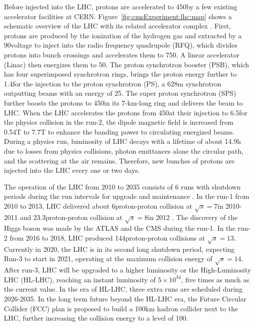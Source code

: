 Before injected into the LHC, protons are accelerated to 450\GeV by a few existing accelerator facilities at CERN. Figure~\ref{fig:cmsExperiment:lhc:map} shows a schematic overview of the LHC with its related accelerator complex  \cite{exhep:lhcInject:Benedikt:2004wm}. First, protons are produced by the ionization of the hydrogen gas and extracted by a 90\keV voltage to inject into the radio frequency quadrupole (RFQ), which divides protons into bunch crossings and accelerates them to 750\keV. A linear accelerator (Linac) then energizes them to 50\MeV. The proton synchrotron booster (PSB), which has four superimposed synchrotron rings, brings the proton energy further to 1.4\GeV for the injection to the proton synchrotron (PS), a 628m synchrotron outputting beams with an energy of 25\GeV. The super proton synchrotron (SPS) further boosts the protons to 450\GeV in its 7-km-long ring and delivers the beam to LHC. When the LHC accelerates the protons from 450\GeV at their injection to 6.5\TeV for the physics collision in the run-2, the dipole magnetic field is increased from 0.54T to 7.7T to enhance the banding power to circulating energized beams. During a physics run, luminosity of LHC decays with a lifetime of about 14.9h \cite{exhep:lhc:Evans:2008zzb} due to losses from physics collisions, photon emittances alone the circular path, and the scattering at the air remains. Therefore, new bunches of protons are injected into the LHC every one or two days.



The operation of the LHC from 2010 to 2035 consists of 6 runs with shutdown periods during the run intervals for upgrade and maintenance . In the run-1 from 2010 to 2013, LHC delivered about 6\fbinv proton-proton collision at $\sqrt{s}=7$\TeV in 2010-2011 and 23.3\fbinv proton-proton collision at $\sqrt{s}=8$\TeV in 2012 \cite{cms:publicLumiInfo}. The discovery of the Higgs boson was made by the ATLAS \cite{exhep:atlasHiggsDisc:Aad:2012tfa} and the CMS \cite{exhep:cmsHiggsDisc:Chatrchyan:2012ufa} during the run-1. In the run-2 from 2016 to 2018, LHC produced 144\fbinv proton-proton collisions at $\sqrt{s}=13$\TeV \cite{cms:publicLumiInfo}. Currently in 2020, the LHC is in its second long shutdown period, expecting Run-3 to start in 2021, operating at the maximum collision energy of $\sqrt{s}=14$\TeV. After run-3, LHC will be upgraded to a higher luminosity or the High-Luminosity LHC (HL-LHC), reaching an instant luminosity of $5 \times 10^{34}$\percms, five times as much as the current value. In the era of HL-LHC, three extra runs are scheduled during 2026-2035. In the long term future beyond the HL-LHC era, the Future Circular Collider (FCC) \cite{exhep:fcc:Benedikt:2715354} plan is proposed to build a 100km hadron collider next to the LHC, further increasing the collision energy to a level of 100\TeV.